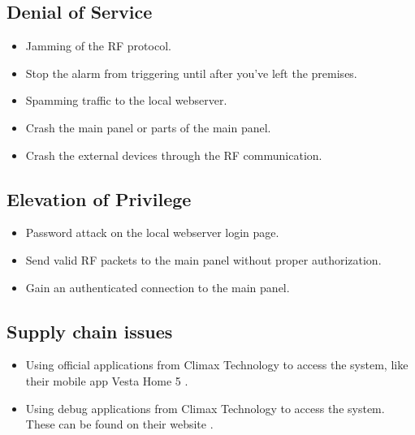 \subsection{Denial of Service}
\begin{itemize}
    \item Jamming of the RF protocol.
    \item Stop the alarm from triggering until after you've left the premises.
    \item Spamming traffic to the local webserver.
    \item Crash the main panel or parts of the main panel.
    \item Crash the external devices through the RF communication.
\end{itemize}

\subsection{Elevation of Privilege}
\begin{itemize}
    \item Password attack on the local webserver login page.
    \item Send valid RF packets to the main panel without proper authorization.
    \item Gain an authenticated connection to the main panel.
\end{itemize}

\subsection{Supply chain issues}
\begin{itemize}
    \item Using official applications from Climax Technology to access the system, like their mobile app Vesta Home 5 .
    \item Using debug applications from Climax Technology to access the system. These can be found on their website .
\end{itemize}
